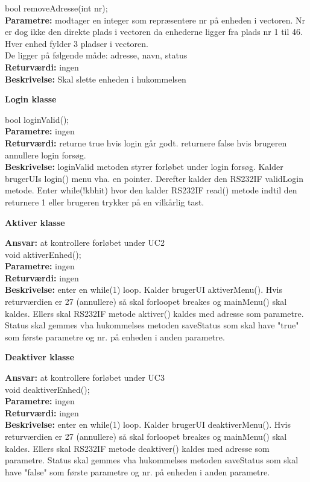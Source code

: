 \newpage

bool removeAdresse(int nr); \\
\textbf{Parametre:} modtager en integer som repræsentere nr på enheden i vectoren. Nr er dog ikke den direkte plads i vectoren da enhederne ligger fra plads nr 1 til 46. Hver enhed fylder 3 pladser i vectoren.  \\
De ligger på følgende måde: adresse, navn, status \\
\textbf{Returværdi:} ingen \\
\textbf{Beskrivelse:} Skal slette enheden i hukommelsen\\

{\centering 
\textbf{Login klasse}\par
}

bool loginValid(); \\
\textbf{Parametre:} ingen  \\
\textbf{Returværdi:} returne true hvis login går godt. returnere false hvis brugeren annullere login forsøg. \\
\textbf{Beskrivelse:} loginValid metoden styrer forløbet under login forsøg. Kalder brugerUIs login() menu vha. en pointer. Derefter kalder den RS232IF validLogin metode. Enter while(!kbhit) hvor den kalder RS232IF read() metode indtil den returnere 1 eller brugeren trykker på en vilkårlig tast. \\

{\centering 
\textbf{Aktiver klasse}\par
}
\textbf{Ansvar:} at kontrollere forløbet under UC2 \\
void aktiverEnhed(); \\
\textbf{Parametre:} ingen \\
\textbf{Returværdi:} ingen \\
\textbf{Beskrivelse:} enter en while(1) loop. Kalder brugerUI aktiverMenu(). Hvis returværdien er 27 (annullere) så skal forloopet breakes og mainMenu() skal kaldes. Ellers skal RS232IF metode aktiver() kaldes med adresse som parametre. Status skal gemmes vha hukommelses metoden saveStatus som skal have "true" som første parametre og nr. på enheden i anden parametre. \\

{\centering 
\textbf{Deaktiver klasse}\par
}
\textbf{Ansvar:} at kontrollere forløbet under UC3 \\

void deaktiverEnhed(); \\
\textbf{Parametre:} ingen \\
\textbf{Returværdi:} ingen \\
\textbf{Beskrivelse:} enter en while(1) loop. Kalder brugerUI deaktiverMenu(). Hvis returværdien er 27 (annullere) så skal forloopet breakes og mainMenu() skal kaldes. Ellers skal RS232IF metode deaktiver() kaldes med adresse som parametre. Status skal gemmes vha hukommelses metoden saveStatus som skal have "false" som første parametre og nr. på enheden i anden parametre. \\

